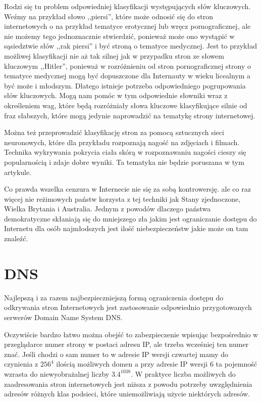 \documentclass[10pt,twoside,a4paper]{article}
\begin{document}
Rodzi się tu problem odpowiedniej klasyfikacji występujących słów kluczowych. Weźmy na przykład słowo ,,piersi'', które może odnosić się do stron internetowych o na przykład tematyce erotycznej lub wręcz pornograficznej, ale nie możemy tego jednoznacznie stwierdzić, ponieważ może ono wystąpić w sąsiedztwie słów ,,rak piersi'' i być stroną o tematyce medycznej. Jest to przykład możliwej klasyfikacji nie aż tak silnej jak w przypadku stron ze słowem kluczowym ,,Hitler'', ponieważ w rozróżnieniu od stron pornograficznej strony o tematyce medycznej mogą być dopuszczone dla Internauty w wieku licealnym a być może i młodszym. Dlatego istnieje potrzeba odpowiedniego pogrupowania słów kluczowych. Mogą nam pomóc w tym odpowiednie słowniki wraz z określeniem wag, które będą rozróżniały słowa kluczowe klasyfikujące silnie od fraz słabszych, które mogą jedynie naprowadzić na tematykę strony internetowej.

Można też przeprowadzić klasyfikację stron za pomocą sztucznych sieci neuronowych, które dla przykładu rozpoznają nagość na zdjęciach i filmach\cite{will_archer_arentz_classifying_nodate, radhouane_guermazi_combining_2007, giuseppe_amato_detection_2009}. Technika wykrywania pokrycia ciała skórą w rozpoznawaniu nagości cieszy się popularnością i zdaje dobre wyniki\cite{mohammad_reza_mahmoodi_high_nodate}. Ta tematyka nie będzie poruszana w tym artykule.

Co prawda wszelka cenzura w Internecie nie się za sobą kontrowersję\cite{jonathan_zittrain_internet_2003}. ale co raz więcej nie reżimowych państw korzysta z tej techniki jak Stany zjednoczone, Wielka Brytania i Australia. Jednym z powodów dlaczego państwa demokratyczne skłaniają się do mniejszego zła jakim jest ograniczanie dostępu do Internetu dla osób najmłodszych jest ilość niebezpieczeństw jakie może on tam znaleźć.\cite{piotr_luczuk_cyberwojna_2016}

\section{DNS}
Najlepszą i za razem najbezpieczniejszą formą ograniczenia dostępu do odkrywania stron Internetowych jest zastosowanie odpowiednio przygotowanych serwerów Domain Name System DNS.\cite{j._postel_domain_1984, p._mockapetris_domain_1987}

Oczywiście bardzo łatwo można obejść to zabezpieczenie wpisując  bezpośrednio w przeglądarce numer strony w postaci adresu IP, ale trzeba wcześniej ten numer znać. Jeśli chodzi o sam numer to w adresie IP wersji czwartej mamy do czynienia z  \({256}^{4}\) ilością możliwych domen a przy adresie IP wersji 6 ta pojemność wzrasta do niewyobrażalnej liczby  \(3.4^{1038}\). W praktyce liczba możliwych do zaadresowania stron internetowych jest niższa z powodu potrzeby uwzględnienia adresów różnych klas podsieci, które uniemożliwiają użycie niektórych adresów.
\end{document}
